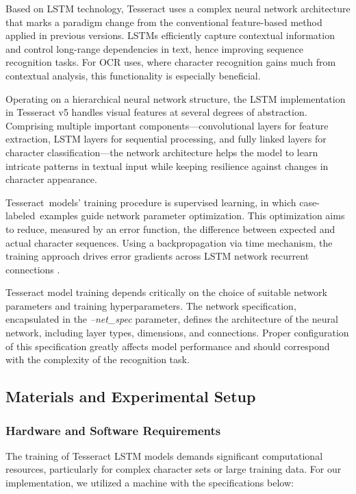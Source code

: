 Based on LSTM technology, Tesseract uses a complex neural network architecture that marks a paradigm change from the conventional feature-based method applied in previous versions. LSTMs efficiently capture contextual information and control long-range dependencies in text, hence improving sequence recognition tasks\cite{hochreiter1997long}. For OCR uses, where character recognition gains much from contextual analysis, this functionality is especially beneficial.

Operating on a hierarchical neural network structure, the LSTM implementation in Tesseract v5 handles visual features at several degrees of abstraction. Comprising multiple important components—convolutional layers for feature extraction, LSTM layers for sequential processing, and fully linked layers for character classification—the network  architecture helps the model to learn intricate patterns in textual input while keeping resilience against changes in character appearance.

Tesseract models' training procedure is supervised learning, in which case-labeled examples guide network parameter optimization. This optimization aims to reduce, measured by an error function, the difference between expected and actual character sequences. Using a backpropagation via time mechanism, the training approach drives error gradients across LSTM network recurrent connections \cite{graves2006connectionist}.

Tesseract model training depends critically on the choice of suitable network parameters and training hyperparameters. The network specification, encapsulated in the \textit{--net\_spec} parameter, defines the architecture of the neural network, including layer types, dimensions, and connections. Proper configuration of this specification greatly affects model performance and should correspond with the complexity of the recognition task.

\subsection{Materials and Experimental Setup}
\subsubsection{Hardware and Software Requirements
}
The training of Tesseract LSTM models demands significant computational resources, particularly for complex character sets or large training data. For our implementation, we utilized a machine  with the specifications below:

